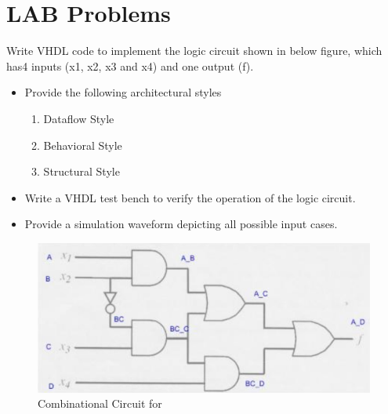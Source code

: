 \documentclass{article}
\begin{document}
\pagebreak


\section{LAB Problems}


\begin{Q}
    {
        Write VHDL code to implement the logic circuit shown in below figure, which has4 inputs (x1, x2, x3 and x4) and one output (f).
        \begin{itemize}
            \item Provide the following architectural styles
                  \begin{enumerate}
                      \item Dataflow Style
                      \item  Behavioral Style
                      \item  Structural Style
                  \end{enumerate}
            \item Write a VHDL test bench to verify the operation of the logic circuit.
            \item Provide a simulation waveform depicting all possible input cases.
        \end{itemize}
    }
\end{Q}


\begin{figure}[H]
    \centering
    \includegraphics[scale=0.52,cframe=blue 0.5pt 3pt]{q1.jpg}
    \caption{Combinational Circuit for }
\end{figure}
\end{document}
